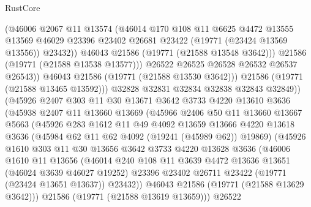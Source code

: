 \begin{lexlean}{RustCore}
\begin{coremodule}
                    (@46006
                      @2067
                      @11
                      @13574
                      (@46014
                        @170
                        @108
                        @11
                        @6625
                        @4472
                        @13555
                        @13569
                        @46029
                        @23396
                        @23402
                        @26681
                        @23422
                        (@19771 (@23424 @13569 @13556))
                        @23432))
                    @46043
                    @21586
                    (@19771 (@21588 @13548 @3642)))
                  @21586
                  (@19771 (@21588 @13538 @13577)))
                @26522
                @26525
                @26528
                @26532
                @26537
                @26543))
            @46043
            @21586
            (@19771 (@21588 @13530 @3642)))
          @21586
          (@19771 (@21588 @13465 @13592)))
        @32828
        @32831
        @32834
        @32838
        @32843
        @32849))
    (@45926
      @2407
      @303
      @11
      @30
      @13671
      @3642
      @3733
      @4220
      @13610
      @3636
      (@45938
        @2407
        @11
        @13660
        @13669
        (@45966
          @2406
          @50
          @11
          @13660
          @13667
          @5663
          (@45926
            @283
            @1612
            @11
            @49
            @4092
            @13659
            @13666
            @4220
            @13618
            @3636
            (@45984 @62 @11 @62 @4092 (@19241 (@45989 @62)) @19869)
            (@45926
              @1610
              @303
              @11
              @30
              @13656
              @3642
              @3733
              @4220
              @13628
              @3636
              (@46006
                @1610
                @11
                @13656
                (@46014
                  @240
                  @108
                  @11
                  @3639
                  @4472
                  @13636
                  @13651
                  (@46024 @3639 @46027 @19252)
                  @23396
                  @23402
                  @26711
                  @23422
                  (@19771 (@23424 @13651 @13637))
                  @23432))
              @46043
              @21586
              (@19771 (@21588 @13629 @3642)))
            @21586
            (@19771 (@21588 @13619 @13659)))
          @26522

\end{coremodule}
\end{lexlean}
